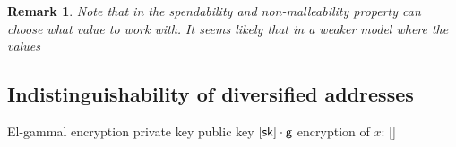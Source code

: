 \documentclass[11pt]{article}
\numberwithin{equation}{section} %
\numberwithin{figure}{section} %
\newtheorem{remark}[thm]{Remark}
\newcommand{\inp}{\ensuremath{\mathsf{inp}}\xspace}
\begin{document}
\begin{remark}
 Note that in the spendability and non-malleability property \adv can choose what value \nf to work with.
 It seems likely that in a weaker model where the values \nf 
\end{remark}





% 
% 
% 
% 
% 
% 
% 
% 
% 
% 


\subsection{Indistinguishability of diversified addresses}


El-gammal encryption
private key \sk
public key $[\mathsf{sk}]\cdot \mathsf{g}$
encryption of $x$: [\sk]


\end{document}
